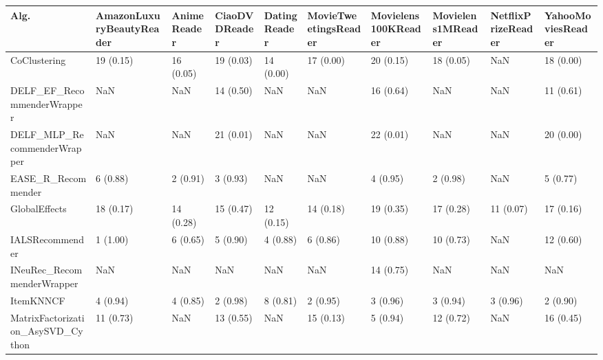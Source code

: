 \begin{tabular}{llllllllll}
\toprule
                               Alg. & AmazonLuxuryBeautyReader & AnimeReader & CiaoDVDReader & DatingReader & MovieTweetingsReader & Movielens100KReader & Movielens1MReader & NetflixPrizeReader & YahooMoviesReader \\
\midrule
                       CoClustering &                19 (0.15) &   16 (0.05) &     19 (0.03) &    14 (0.00) &            17 (0.00) &           20 (0.15) &         18 (0.05) &                NaN &         18 (0.00) \\
         DELF\_EF\_RecommenderWrapper &                      NaN &         NaN &     14 (0.50) &          NaN &                  NaN &           16 (0.64) &               NaN &                NaN &         11 (0.61) \\
        DELF\_MLP\_RecommenderWrapper &                      NaN &         NaN &     21 (0.01) &          NaN &                  NaN &           22 (0.01) &               NaN &                NaN &         20 (0.00) \\
                 EASE\_R\_Recommender &                 6 (0.88) &    2 (0.91) &      3 (0.93) &          NaN &                  NaN &            4 (0.95) &          2 (0.98) &                NaN &          5 (0.77) \\
                      GlobalEffects &                18 (0.17) &   14 (0.28) &     15 (0.47) &    12 (0.15) &            14 (0.18) &           19 (0.35) &         17 (0.28) &          11 (0.07) &         17 (0.16) \\
                    IALSRecommender &                 1 (1.00) &    6 (0.65) &      5 (0.90) &     4 (0.88) &             6 (0.86) &           10 (0.88) &         10 (0.73) &                NaN &         12 (0.60) \\
         INeuRec\_RecommenderWrapper &                      NaN &         NaN &           NaN &          NaN &                  NaN &           14 (0.75) &               NaN &                NaN &               NaN \\
                          ItemKNNCF &                 4 (0.94) &    4 (0.85) &      2 (0.98) &     8 (0.81) &             2 (0.95) &            3 (0.96) &          3 (0.94) &           3 (0.96) &          2 (0.90) \\
  MatrixFactorization\_AsySVD\_Cython &                11 (0.73) &         NaN &     13 (0.55) &          NaN &            15 (0.13) &            5 (0.94) &         12 (0.72) &                NaN &         16 (0.45) \\

\end{tabular}
